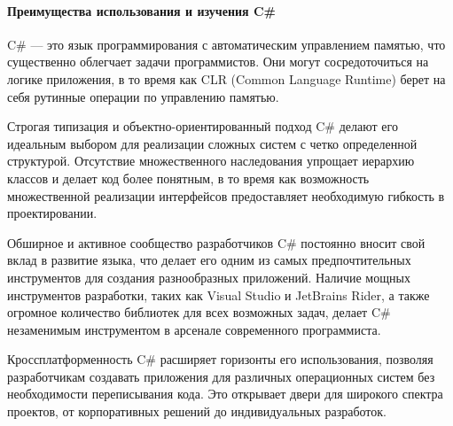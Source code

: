 \paragraph{Преимущества использования и изучения C\#}

C\# — это язык программирования с автоматическим управлением памятью, что существенно облегчает задачи программистов. Они могут сосредоточиться на логике приложения, в то время как CLR (Common Language Runtime) берет на себя рутинные операции по управлению памятью.

Строгая типизация и объектно-ориентированный подход C\# делают его идеальным выбором для реализации сложных систем с четко определенной структурой. Отсутствие множественного наследования упрощает иерархию классов и делает код более понятным, в то время как возможность множественной реализации интерфейсов предоставляет необходимую гибкость в проектировании.

Обширное и активное сообщество разработчиков C\# постоянно вносит свой вклад в развитие языка, что делает его одним из самых предпочтительных инструментов для создания разнообразных приложений. Наличие мощных инструментов разработки, таких как Visual Studio и JetBrains Rider, а также огромное количество библиотек для всех возможных задач, делает C\# незаменимым инструментом в арсенале современного программиста.

Кроссплатформенность C\# расширяет горизонты его использования, позволяя разработчикам создавать приложения для различных операционных систем без необходимости переписывания кода. Это открывает двери для широкого спектра проектов, от корпоративных решений до индивидуальных разработок.

